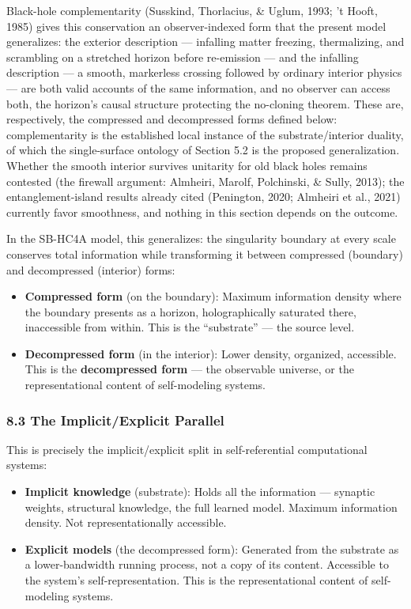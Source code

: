 \documentclass[
]{article}
\providecommand{\tightlist}{%
  \setlength{\itemsep}{0pt}\setlength{\parskip}{0pt}}
\begin{document}
Black-hole complementarity (Susskind, Thorlacius, \& Uglum, 1993; 't
Hooft, 1985) gives this conservation an observer-indexed form that the
present model generalizes: the exterior description --- infalling matter
freezing, thermalizing, and scrambling on a stretched horizon before
re-emission --- and the infalling description --- a smooth, markerless
crossing followed by ordinary interior physics --- are both valid
accounts of the same information, and no observer can access both, the
horizon's causal structure protecting the no-cloning theorem. These are,
respectively, the compressed and decompressed forms defined below:
complementarity is the established local instance of the
substrate/interior duality, of which the single-surface ontology of
Section 5.2 is the proposed generalization. Whether the smooth interior
survives unitarity for old black holes remains contested (the firewall
argument: Almheiri, Marolf, Polchinski, \& Sully, 2013); the
entanglement-island results already cited (Penington, 2020; Almheiri et
al., 2021) currently favor smoothness, and nothing in this section
depends on the outcome.

In the SB-HC4A model, this generalizes: the singularity boundary at
every scale conserves total information while transforming it between
compressed (boundary) and decompressed (interior) forms:

\begin{itemize}
\tightlist
\item
  \textbf{Compressed form} (on the boundary): Maximum information
  density where the boundary presents as a horizon, holographically
  saturated there, inaccessible from within. This is the ``substrate''
  --- the source level.
\item
  \textbf{Decompressed form} (in the interior): Lower density,
  organized, accessible. This is the \textbf{decompressed form} --- the
  observable universe, or the representational content of self-modeling
  systems.
\end{itemize}

\hypertarget{the-implicitexplicit-parallel}{%
\subsubsection{8.3 The Implicit/Explicit
Parallel}\label{the-implicitexplicit-parallel}}

This is precisely the implicit/explicit split in self-referential
computational systems:

\begin{itemize}
\tightlist
\item
  \textbf{Implicit knowledge} (substrate): Holds all the information ---
  synaptic weights, structural knowledge, the full learned model.
  Maximum information density. Not representationally accessible.
\item
  \textbf{Explicit models} (the decompressed form): Generated from the
  substrate as a lower-bandwidth running process, not a copy of its
  content. Accessible to the system's self-representation. This is the
  representational content of self-modeling systems.
\end{itemize}
\end{document}
